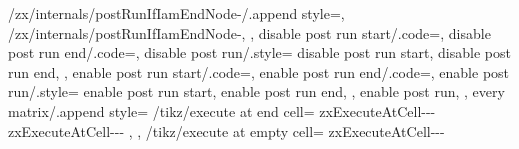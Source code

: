 {{{{{{              /zx/internals/postRunIfIamEndNode-\tikzcd@ar@target/.append style={},%
              /zx/internals/postRunIfIamEndNode-\tikzcd@ar@target,%
            }%
            \pgfkeysalsofrom{\zx@tmp}%
          \fi%
        }%
      },%
      disable post run start/.code={\def\zxDisablePostRunStart{}},
      disable post run end/.code={\def\zxDisablePostRunEnd{}},
      disable post run/.style={
        disable post run start,
        disable post run end,
      },
      enable post run start/.code={\let\zxDisablePostRunStart\undefined},
      enable post run end/.code={\let\zxDisablePostRunEnd\undefined},
      enable post run/.style={
        enable post run start,
        enable post run end,
      },
      enable post run,
    },
    every matrix/.append style={
      /tikz/execute at end cell={%
        \ifcsname zxExecuteAtCell-\zxCurrentDiagram-\the\pgfmatrixcurrentrow-\the\pgfmatrixcurrentcolumn\endcsname%
          \csname zxExecuteAtCell-\zxCurrentDiagram-\the\pgfmatrixcurrentrow-\the\pgfmatrixcurrentcolumn\endcsname%
        \fi%
      },%
    },%
    /tikz/execute at empty cell={%
      \ifcsname zxExecuteAtCell-\zxCurrentDiagram-\the\pgfmatrixcurrentrow-\the\pgfmatrixcurrentcolumn\endcsname%
}}}

